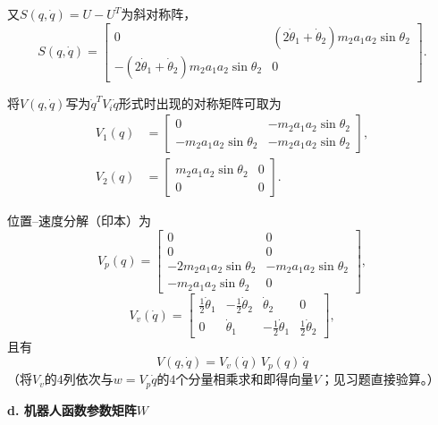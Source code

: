 \documentclass[12pt,a4paper]{ctexart}
\begin{document}
又$S(q,\dot{q}) = U - U^T$为斜对称阵，
\begin{equation}
S(q,\dot{q}) = \begin{bmatrix} 0 & (2\dot{\theta}_1 + \dot{\theta}_2)m_2a_1a_2\sin\theta_2 \\ -(2\dot{\theta}_1 + \dot{\theta}_2)m_2a_1a_2\sin\theta_2 & 0 \end{bmatrix}.
\end{equation}

将$V(q,\dot{q})$写为$\dot{q}^T V_i \dot{q}$形式时出现的对称矩阵可取为
\begin{align}
V_1(q) &= \begin{bmatrix} 0 & -m_2a_1a_2\sin\theta_2 \\ -m_2a_1a_2\sin\theta_2 & -m_2a_1a_2\sin\theta_2 \end{bmatrix}, \\
V_2(q) &= \begin{bmatrix} m_2a_1a_2\sin\theta_2 & 0 \\ 0 & 0 \end{bmatrix}.
\end{align}

位置–速度分解（印本）为
\begin{equation}
V_p(q) = \begin{bmatrix} 0 & 0 \\ 0 & 0 \\ -2m_2a_1a_2\sin\theta_2 & -m_2a_1a_2\sin\theta_2 \\ -m_2a_1a_2\sin\theta_2 & 0 \end{bmatrix},
\end{equation}
\begin{equation}
V_v(\dot{q}) = \begin{bmatrix} \frac{1}{2}\dot{\theta}_1 & -\frac{1}{2}\dot{\theta}_2 & \dot{\theta}_2 & 0 \\[2pt] 0 & \dot{\theta}_1 & -\frac{1}{2}\dot{\theta}_1 & \frac{1}{2}\dot{\theta}_2 \end{bmatrix},
\end{equation}
且有
\begin{equation}
V(q,\dot{q}) = V_v(\dot{q})\,V_p(q)\,\dot{q}
\end{equation}
（将$V_v$的$4$列依次与$w=V_p\dot{q}$的$4$个分量相乘求和即得向量$V$；见习题直接验算。）

\textbf{d. 机器人函数参数矩阵$W$}
\end{document}
